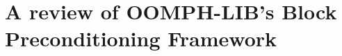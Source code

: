 \documentclass[12pt,a4paper]{report}
\begin{document}
%

\pagestyle{plain}
\setcounter{page}{1}


%

%

%

%

\chapter{A review of OOMPH-LIB's Block Preconditioning Framework\label{chap:block_preconditioning_framework}}


%

%

\thispagestyle{empty}\newpage

\appendix
%
%

%
\end{document}
